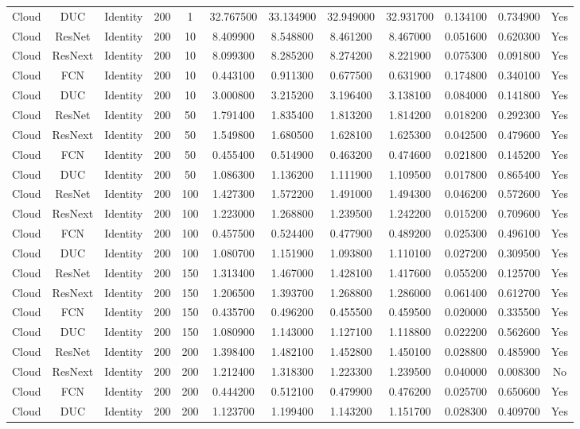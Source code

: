 \begin{tabular}{|c||c||c||c||c||c||c||c||c||c||c||c|}
Cloud & DUC & Identity & 200 & 1 & 32.767500 & 33.134900 & 32.949000 & 32.931700 & 0.134100 & 0.734900 & Yes \\
Cloud & ResNet & Identity & 200 & 10 & 8.409900 & 8.548800 & 8.461200 & 8.467000 & 0.051600 & 0.620300 & Yes \\
Cloud & ResNext & Identity & 200 & 10 & 8.099300 & 8.285200 & 8.274200 & 8.221900 & 0.075300 & 0.091800 & Yes \\
Cloud & FCN & Identity & 200 & 10 & 0.443100 & 0.911300 & 0.677500 & 0.631900 & 0.174800 & 0.340100 & Yes \\
Cloud & DUC & Identity & 200 & 10 & 3.000800 & 3.215200 & 3.196400 & 3.138100 & 0.084000 & 0.141800 & Yes \\
Cloud & ResNet & Identity & 200 & 50 & 1.791400 & 1.835400 & 1.813200 & 1.814200 & 0.018200 & 0.292300 & Yes \\
Cloud & ResNext & Identity & 200 & 50 & 1.549800 & 1.680500 & 1.628100 & 1.625300 & 0.042500 & 0.479600 & Yes \\
Cloud & FCN & Identity & 200 & 50 & 0.455400 & 0.514900 & 0.463200 & 0.474600 & 0.021800 & 0.145200 & Yes \\
Cloud & DUC & Identity & 200 & 50 & 1.086300 & 1.136200 & 1.111900 & 1.109500 & 0.017800 & 0.865400 & Yes \\
Cloud & ResNet & Identity & 200 & 100 & 1.427300 & 1.572200 & 1.491000 & 1.494300 & 0.046200 & 0.572600 & Yes \\
Cloud & ResNext & Identity & 200 & 100 & 1.223000 & 1.268800 & 1.239500 & 1.242200 & 0.015200 & 0.709600 & Yes \\
Cloud & FCN & Identity & 200 & 100 & 0.457500 & 0.524400 & 0.477900 & 0.489200 & 0.025300 & 0.496100 & Yes \\
Cloud & DUC & Identity & 200 & 100 & 1.080700 & 1.151900 & 1.093800 & 1.110100 & 0.027200 & 0.309500 & Yes \\
Cloud & ResNet & Identity & 200 & 150 & 1.313400 & 1.467000 & 1.428100 & 1.417600 & 0.055200 & 0.125700 & Yes \\
Cloud & ResNext & Identity & 200 & 150 & 1.206500 & 1.393700 & 1.268800 & 1.286000 & 0.061400 & 0.612700 & Yes \\
Cloud & FCN & Identity & 200 & 150 & 0.435700 & 0.496200 & 0.455500 & 0.459500 & 0.020000 & 0.335500 & Yes \\
Cloud & DUC & Identity & 200 & 150 & 1.080900 & 1.143000 & 1.127100 & 1.118800 & 0.022200 & 0.562600 & Yes \\
Cloud & ResNet & Identity & 200 & 200 & 1.398400 & 1.482100 & 1.452800 & 1.450100 & 0.028800 & 0.485900 & Yes \\
Cloud & ResNext & Identity & 200 & 200 & 1.212400 & 1.318300 & 1.223300 & 1.239500 & 0.040000 & 0.008300 & No \\
Cloud & FCN & Identity & 200 & 200 & 0.444200 & 0.512100 & 0.479900 & 0.476200 & 0.025700 & 0.650600 & Yes \\
Cloud & DUC & Identity & 200 & 200 & 1.123700 & 1.199400 & 1.143200 & 1.151700 & 0.028300 & 0.409700 & Yes \\
\bottomrule
\end{tabular}
